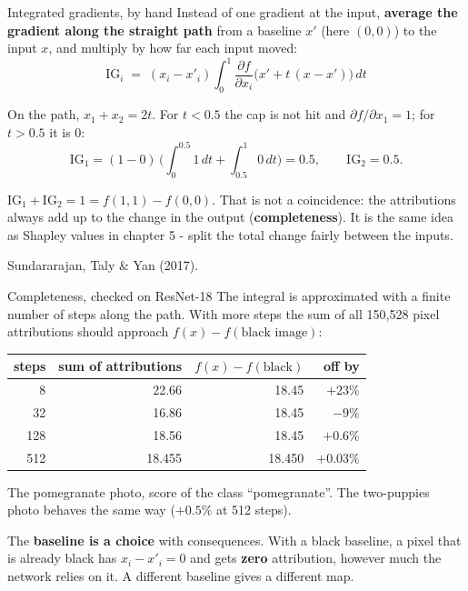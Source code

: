 \documentclass[aspectratio=169]{beamer}
\newcommand{\keybox}[1]{%
  \begin{tcolorbox}[colback=armblue!8, colframe=armblue, boxrule=0.6pt, arc=2pt]
  #1
  \end{tcolorbox}}
\newcommand{\watchbox}[1]{%
  \begin{tcolorbox}[colback=armorange!12, colframe=armorange, boxrule=0.6pt, arc=2pt]
  #1
  \end{tcolorbox}}
\begin{document}
\begin{frame}{Integrated gradients, by hand}
  \vspace{0.2em}
  Instead of one gradient at the input, \textbf{average the gradient along the straight path} from a
  baseline $x'$ (here $(0,0)$) to the input $x$, and multiply by how far each input moved:
  \[
    \text{IG}_i \;=\; (x_i - x'_i)\int_0^1 \frac{\partial f}{\partial x_i}\big(x' + t\,(x - x')\big)\,dt
  \]

  \vspace{0.2em}
  On the path, $x_1 + x_2 = 2t$. For $t < 0.5$ the cap is not hit and $\partial f/\partial x_1 = 1$;
  for $t > 0.5$ it is 0:
  \[
    \text{IG}_1 = (1 - 0)\,\Big(\int_0^{0.5} 1\,dt + \int_{0.5}^{1} 0\,dt\Big) = 0.5,
    \qquad \text{IG}_2 = 0.5 .
  \]

  \vspace{0.2em}
  \keybox{\small $\text{IG}_1 + \text{IG}_2 = 1 = f(1,1) - f(0,0)$. That is not a coincidence: the
  attributions always add up to the change in the output (\textbf{completeness}). It is the same
  idea as Shapley values in chapter 5 - split the total change fairly between the inputs.}

  \vspace{0.1em}
  {\footnotesize Sundararajan, Taly \& Yan (2017).}
\end{frame}

\begin{frame}{Completeness, checked on ResNet-18}
  \vspace{0.4em}
  The integral is approximated with a finite number of steps along the path. With more steps the
  sum of all 150{,}528 pixel attributions should approach $f(x) - f(\text{black image})$:

  \vspace{0.5em}
  \begin{center}
  \small
  \begin{tabular}{@{}rrrr@{}}
    \toprule
    steps & sum of attributions & $f(x) - f(\text{black})$ & off by\\
    \midrule
    8 & 22.66 & 18.45 & $+23\%$\\
    32 & 16.86 & 18.45 & $-9\%$\\
    128 & 18.56 & 18.45 & $+0.6\%$\\
    512 & 18.455 & 18.450 & $+0.03\%$\\
    \bottomrule
  \end{tabular}
  \end{center}

  {\footnotesize The pomegranate photo, score of the class ``pomegranate''. The two-puppies photo
  behaves the same way ($+0.5\%$ at 512 steps).}

  \vspace{0.2em}
  \watchbox{\small The \textbf{baseline is a choice} with consequences. With a black baseline, a
  pixel that is already black has $x_i - x'_i = 0$ and gets \textbf{zero} attribution, however
  much the network relies on it. A different baseline gives a different map.}
\end{frame}
\end{document}
